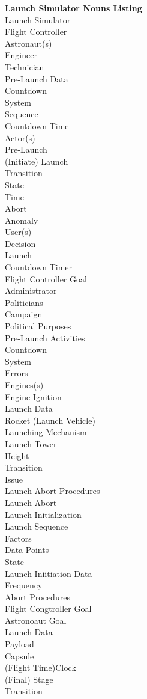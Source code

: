 \documentclass[letterpaper]{article}
\begin{document}
\noindent
\textbf{Launch Simulator Nouns Listing}\\
Launch Simulator\\
Flight Controller\\
Astronaut(s)\\
Engineer\\
Technician\\
Pre-Launch Data\\
Countdown\\
System\\
Sequence\\
Countdown Time\\
Actor(s)\\
Pre-Launch\\
(Initiate) Launch\\
Transition\\
State\\
Time\\
Abort\\
Anomaly\\
User(s)\\
Decision\\
Launch\\
Countdown Timer\\
Flight Controller Goal\\
Administrator\\
Politicians\\
Campaign\\
Political Purposes\\
Pre-Launch Activities\\
Countdown\\
System\\
Errors\\
Engines(s)\\
Engine Ignition\\
Launch Data\\
Rocket (Launch Vehicle)\\
Launching Mechanism\\
Launch Tower\\
Height\\
Transition\\
Issue\\
Launch Abort Procedures\\
Launch Abort\\
Launch Initialization\\
Launch Sequence\\
Factors\\
Data Points\\
State\\
Launch Iniitiation Data\\
Frequency\\
Abort Procedures\\
Flight Congtroller Goal\\
Astronoaut Goal\\
Launch Data\\
Payload\\
Capsule\\
(Flight Time)Clock\\
(Final) Stage\\
Transition\\
\end{document}

